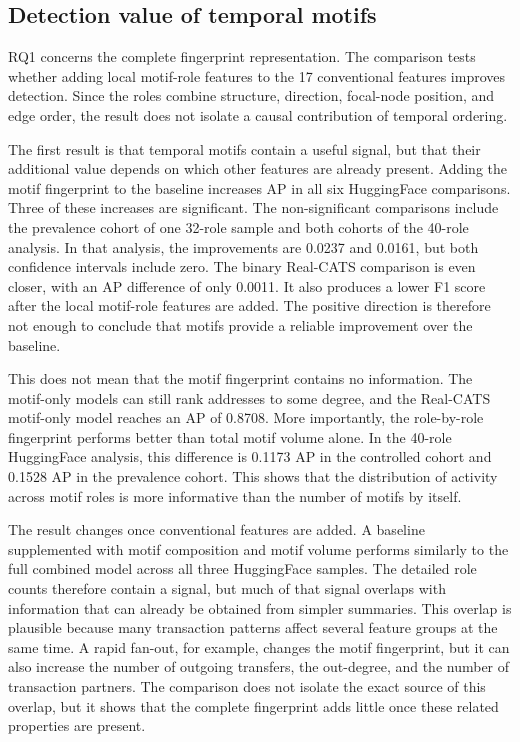 \subsection{Detection value of temporal motifs}

RQ1 concerns the complete fingerprint representation. The comparison tests
whether adding local motif-role features to the 17 conventional features improves
detection. Since the roles combine structure, direction, focal-node position,
and edge order, the result does not isolate a causal contribution of temporal
ordering.

The first result is that temporal motifs contain a useful signal, but that their
additional value depends on which other features are already present. Adding the
motif fingerprint to the baseline increases AP in all six HuggingFace
comparisons. Three of these increases are significant. The non-significant
comparisons include the prevalence cohort of one 32-role sample and both
cohorts of the 40-role analysis. In that analysis, the improvements are 0.0237 and
0.0161, but both confidence intervals include zero. The
binary Real-CATS comparison is even closer, with an AP difference of only
0.0011. It also produces a lower F1 score after the local motif-role features are added.
The positive direction is therefore not enough to conclude that motifs provide
a reliable improvement over the baseline.

This does not mean that the motif fingerprint contains no information. The
motif-only models can still rank addresses to some degree, and the Real-CATS
motif-only model reaches an AP of 0.8708. More importantly, the
role-by-role fingerprint performs better than total motif volume alone. In the
40-role HuggingFace analysis, this difference is 0.1173 AP in the controlled
cohort and 0.1528 AP in the prevalence cohort. This shows that the distribution
of activity across motif roles is more informative than the number of motifs by
itself.

The result changes once conventional features are added. A baseline supplemented
with motif composition and motif volume performs similarly to the full combined
model across all three HuggingFace samples. The detailed role counts therefore
contain a signal,
but much of that signal overlaps with information that can already be obtained
from simpler summaries. This overlap is plausible because many transaction
patterns affect several feature groups at the same time. A rapid fan-out, for
example, changes the motif fingerprint, but it can also increase the number of
outgoing transfers, the out-degree, and the number of transaction partners. The
comparison does not isolate the exact source of this overlap, but it shows that
the complete fingerprint adds little once these related properties are present.

